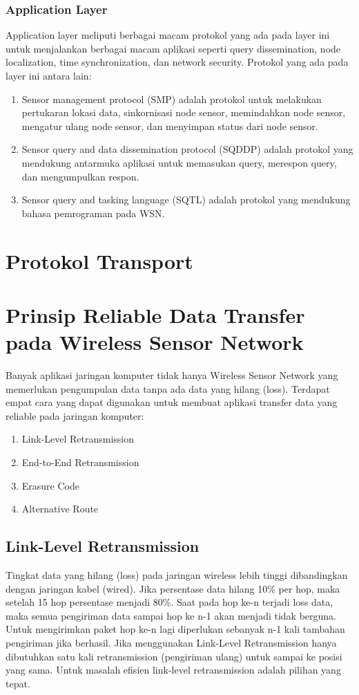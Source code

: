 \subsubsection{Application Layer}
Application layer meliputi berbagai macam protokol yang ada pada layer ini untuk menjalankan berbagai macam aplikasi seperti query dissemination, node localization, time synchronization, dan network security. Protokol yang ada pada layer ini antara lain:
\begin{enumerate}
	\item Sensor management protocol (SMP) adalah protokol untuk melakukan pertukaran lokasi data, sinkornisasi node sensor, memindahkan node sensor, mengatur ulang node sensor, dan menyimpan status dari node sensor.
	\item Sensor query and data dissemination protocol (SQDDP) adalah protokol yang mendukung antarmuka aplikasi untuk memasukan query, merespon query, dan mengumpulkan respon.
	\item Sensor query and tasking language (SQTL) adalah protokol yang mendukung bahasa pemrograman pada WSN.
\end{enumerate}

\section{Protokol Transport}


\section{Prinsip Reliable Data Transfer pada Wireless Sensor Network}
\label{sec:reliable}
Banyak aplikasi jaringan komputer tidak hanya Wireless Sensor Network yang memerlukan pengumpulan data tanpa ada data yang hilang (loss). Terdapat empat cara yang dapat digunakan untuk membuat aplikasi transfer data yang reliable pada jaringan komputer:
\begin{enumerate}
	\item Link-Level Retransmission
	\item End-to-End Retransmission
	\item Erasure Code
	\item Alternative Route
\end{enumerate}

\subsection{Link-Level Retransmission}
Tingkat data yang hilang (loss) pada jaringan wireless lebih tinggi dibandingkan dengan jaringan kabel (wired). Jika persentase data hilang 10\% per hop, maka setelah 15 hop persentase menjadi 80\%. Saat pada hop ke-n terjadi loss data, maka semua pengiriman data sampai hop ke n-1 akan menjadi tidak berguna. Untuk mengirimkan paket hop ke-n lagi diperlukan sebanyak n-1 kali tambahan pengiriman jika berhasil. Jika menggunakan Link-Level Retransmission hanya dibutuhkan satu kali retransmission (pengiriman ulang) untuk sampai ke posisi yang sama. Untuk masalah efisien link-level retransmission adalah pilihan yang tepat.

